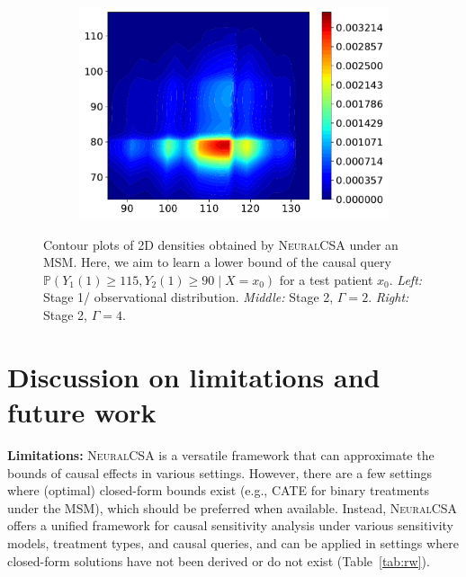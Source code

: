 \documentclass{article} %
\newcommand{\frameworkname}{\textsc{NeuralCSA}\xspace}
\theoremstyle{definition}
\theoremstyle{plain}
\begin{document}
\begin{figure}[ht]
\begin{subfigure}{0.30\textwidth}
\end{subfigure}
\begin{subfigure}{0.30\textwidth}
  \centering
  \includegraphics[width=1\linewidth]{figures/plot_real_stage2_lower_gamma4.pdf}
\end{subfigure}
\caption{Contour plots of 2D densities obtained by \frameworkname under an MSM. Here, we aim to learn a lower bound of the causal query $\mathbb{P}(Y_1(1) \geq 115, Y_2(1) \geq 90 \mid X = x_0)$ for a test patient $x_0$. \emph{Left:} Stage 1/ observational distribution. \emph{Middle:} Stage 2, $\Gamma = 2$. \emph{Right:} Stage 2, $\Gamma = 4$.}
\label{fig:app_real}
\vspace{-0.4cm}
\end{figure}

\clearpage

\section{Discussion on limitations and future work}\label{app:discussion}

\textbf{Limitations:} \frameworkname is a versatile framework that can approximate the bounds of causal effects in various settings. However, there are a few settings where (optimal) closed-form bounds exist (e.g., CATE for binary treatments under the MSM), which should be preferred when available. Instead, \frameworkname offers a unified framework for causal sensitivity analysis under various sensitivity models, treatment types, and causal queries, and can be applied in settings where closed-form solutions have not been derived or do not exist (Table~\ref{tab:rw}).
\end{document}
